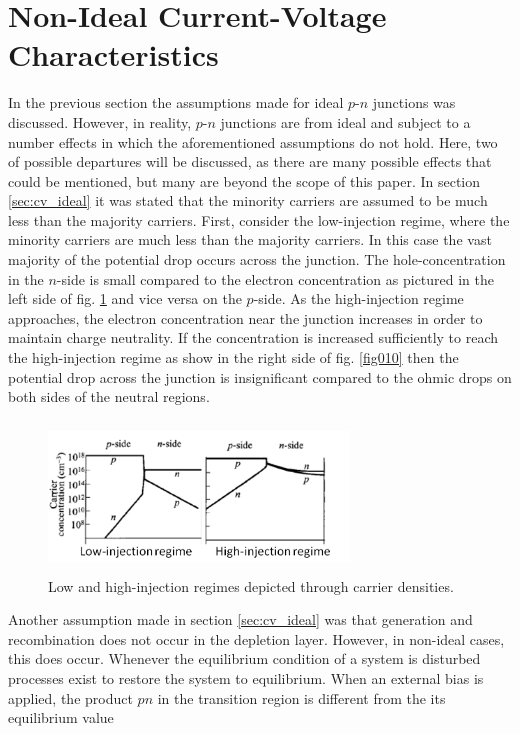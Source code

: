 \section{Non-Ideal Current-Voltage Characteristics}
In the previous section the assumptions made for ideal $p$-$n$ junctions was discussed. However,
in reality, $p$-$n$ junctions are from ideal and subject to a number effects in which the aforementioned assumptions
do not hold. Here, two of possible departures will be discussed, as there are many possible effects that could be mentioned, but many
are beyond the scope of this paper. In section \ref{sec:cv_ideal} it was stated that the minority carriers are assumed to be much less than the
majority carriers. First, consider the low-injection regime, where the minority carriers are much less than the majority carriers. In this case
the vast majority of the potential drop occurs across the junction. The hole-concentration in the $n$-side is small compared to the electron concentration
as pictured in the left side of fig. \ref{fig:fig010} and vice versa on the $p$-side. As the high-injection regime approaches, the electron
concentration near the junction increases in order to maintain charge neutrality. If the concentration is increased sufficiently to reach the high-injection regime
as show in the right side of fig. \ref{fig010} then the potential drop across the junction is insignificant compared to the ohmic drops on both sides of the 
neutral regions. 
\begin{figure}[h!]\label{fig:fig010}
    \centering
    \includegraphics[height=4cm,width=8cm]{figs/high_low_injection}
    \caption{Low and high-injection regimes depicted through carrier densities.}
\end{figure}
Another assumption made in section \ref{sec:cv_ideal} was that generation and recombination does not occur in the depletion 
layer. However, in non-ideal cases, this does occur. Whenever the equilibrium condition of a system is disturbed processes exist to restore
the system to equilibrium. When an external bias is applied, the product $pn$ in the transition region is different from the its equilibrium value
